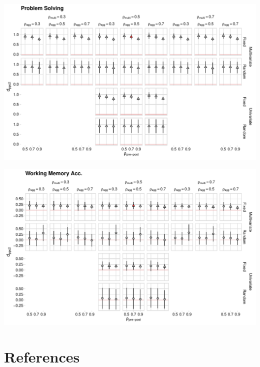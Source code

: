 \documentclass[
]{article}
\begin{document}
\begin{landscape}
\begin{center}\includegraphics[width=648px]{supplementary_files/figure-latex/problem-solving-plot-1} \end{center}


\begin{center}\includegraphics[width=648px]{supplementary_files/figure-latex/working-memory-accuracy-plot-1} \end{center}

\end{landscape}

\hypertarget{references}{%
\section*{References}\label{references}}
\end{document}
